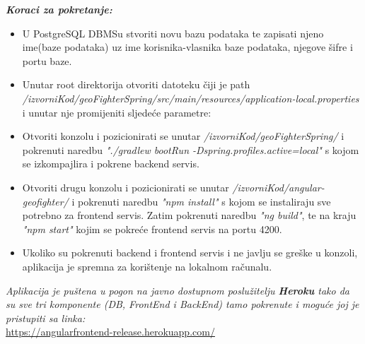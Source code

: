 			\textbf{\textit{Koraci za pokretanje:}}
			
			\begin{itemize}
				
				\item U PostgreSQL DBMSu stvoriti novu bazu podataka te zapisati njeno ime(baze podataka) uz ime korisnika-vlasnika baze podataka, njegove šifre i portu baze.
				
				\item Unutar root direktorija otvoriti datoteku čiji je path\\ \textit{/izvorniKod/geoFighterSpring/src/main/resources/application-local.properties}\\ i unutar nje promijeniti sljedeće parametre: 
				
				\item Otvoriti konzolu i pozicionirati se unutar \textit{/izvorniKod/geoFighterSpring/} i pokrenuti naredbu \textit{"./gradlew bootRun -Dspring.profiles.active=local"} s kojom se izkompajlira i pokrene backend servis.
				
				\item Otvoriti drugu konzolu i pozicionirati se unutar \textit{/izvorniKod/angular-geofighter/} i pokrenuti naredbu \textit{"npm install"} s kojom se instaliraju sve potrebno za frontend servis. Zatim pokrenuti naredbu \textit{"ng build"}, te na kraju \textit{"npm start"} kojim se pokreće frontend servis na portu 4200.
				
				\item Ukoliko su pokrenuti backend i frontend servis i ne javlju se greške u konzoli, aplikacija je spremna za korištenje na lokalnom računalu.
				
			\end{itemize}
		
			\eject
			
			\textit{Aplikacija je puštena u pogon na javno dostupnom poslužitelju \textbf{Heroku} tako da su sve tri komponente (DB, FrontEnd i BackEnd) tamo pokrenute i moguće joj je pristupiti sa linka:}\\
			\url{https://angularfrontend-release.herokuapp.com/}
						
			\eject 
